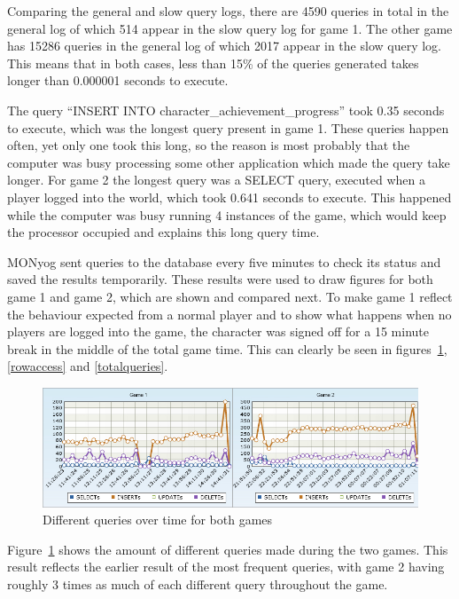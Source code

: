 Comparing the general and slow query logs, there are 4590 queries in total in the general log of which 514 appear in the slow query log for game 1. The other game has  15286 queries in the general log of which 2017 appear in the slow query log. This means that in both cases, less than 15\% of the queries generated takes longer than 0.000001 seconds to execute.

The query ``INSERT INTO character\_achievement\_progress'' took 0.35 seconds to execute, which was the longest query present in game 1. These queries happen often, yet only one took this long, so the reason is most probably that the computer was busy processing some other application which made the query take longer. For game 2 the longest query was a SELECT query, executed when a player logged into the world, which took 0.641 seconds to execute. This happened while the computer was busy running 4 instances of the game, which would keep the processor occupied and explains this long query time.

MONyog sent queries to the database every five minutes to check its status and saved the results temporarily. These results were used to draw figures for both game 1 and game 2, which are shown and compared next. To make game 1 reflect the behaviour expected from a normal player and to show what happens when no players are logged into the game, the character was signed off for a 15 minute break in the middle of the total game time. This can clearly be seen in figures~\ref{diffqueries}, \ref{rowaccess} and \ref{totalqueries}.

\begin{figure}[htbp]
\centering
\includegraphics[scale = 0.75]{statecomp.png}	
\caption{Different queries over time for both games}
\label{diffqueries}
\end{figure}

Figure~\ref{diffqueries} shows the amount of different queries made during the two games. This result reflects the earlier result of the most frequent queries, with game 2 having roughly 3 times as much of each different query throughout the game.

